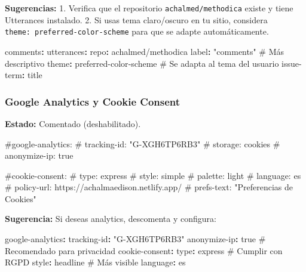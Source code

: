 \documentclass[
  doc,
  floatsintext,
  longtable,
  a4paper,
  nolmodern,
  notxfonts,
  notimes,
  12pt,
  colorlinks=true,linkcolor=blue,citecolor=blue,urlcolor=blue]{apa7}
\newenvironment{Shaded}{\begin{snugshade}}{\end{snugshade}}
\newcommand{\AttributeTok}[1]{\textcolor[rgb]{0.40,0.45,0.13}{#1}}
\newcommand{\CharTok}[1]{\textcolor[rgb]{0.13,0.47,0.30}{#1}}
\newcommand{\CommentTok}[1]{\textcolor[rgb]{0.37,0.37,0.37}{#1}}
\newcommand{\FunctionTok}[1]{\textcolor[rgb]{0.28,0.35,0.67}{#1}}
\newcommand{\KeywordTok}[1]{\textcolor[rgb]{0.00,0.23,0.31}{\textbf{#1}}}
\newcommand{\StringTok}[1]{\textcolor[rgb]{0.13,0.47,0.30}{#1}}
\begin{document}
\textbf{Sugerencias:} 1. Verifica que el repositorio
\texttt{achalmed/methodica} existe y tiene Utterances instalado. 2. Si
usas tema claro/oscuro en tu sitio, considera
\texttt{theme:\ preferred-color-scheme} para que se adapte
automáticamente.

\begin{Shaded}
\begin{Highlighting}[]
\FunctionTok{comments}\KeywordTok{:}
\AttributeTok{  }\FunctionTok{utterances}\KeywordTok{:}
\AttributeTok{    }\FunctionTok{repo}\KeywordTok{:}\AttributeTok{ achalmed/methodica}
\AttributeTok{    }\FunctionTok{label}\KeywordTok{:}\AttributeTok{ }\StringTok{"comments"}\CommentTok{                \# Más descriptivo}
\AttributeTok{    }\FunctionTok{theme}\KeywordTok{:}\AttributeTok{ preferred{-}color{-}scheme}\CommentTok{    \# Se adapta al tema del usuario}
\AttributeTok{    }\FunctionTok{issue{-}term}\KeywordTok{:}\AttributeTok{ title}
\end{Highlighting}
\end{Shaded}

\subsubsection{Google Analytics y Cookie
Consent}\label{google-analytics-y-cookie-consent}

\textbf{Estado:} Comentado (deshabilitado).

\begin{Shaded}
\begin{Highlighting}[]
\CommentTok{\#google{-}analytics:}
\CommentTok{ \# tracking{-}id: "G{-}XGH6TP6RB3"}
\CommentTok{ \# storage: cookies}
\CommentTok{ \# anonymize{-}ip: true}

\CommentTok{\#cookie{-}consent:}
\CommentTok{ \# type: express}
\CommentTok{ \# style: simple}
\CommentTok{ \# palette: light}
\CommentTok{ \# language: es}
\CommentTok{ \# policy{-}url: https://achalmaedison.netlify.app/}
\CommentTok{ \# prefs{-}text: "Preferencias de Cookies"}
\end{Highlighting}
\end{Shaded}

\textbf{Sugerencia:} Si deseas analytics, descomenta y configura:

\begin{Shaded}
\begin{Highlighting}[]
\FunctionTok{google{-}analytics}\KeywordTok{:}
\AttributeTok{  }\FunctionTok{tracking{-}id}\KeywordTok{:}\AttributeTok{ }\StringTok{"G{-}XGH6TP6RB3"}
\AttributeTok{  }\FunctionTok{anonymize{-}ip}\KeywordTok{:}\AttributeTok{ }\CharTok{true}\CommentTok{                 \# Recomendado para privacidad}
\AttributeTok{  }
\FunctionTok{cookie{-}consent}\KeywordTok{:}
\AttributeTok{  }\FunctionTok{type}\KeywordTok{:}\AttributeTok{ express}\CommentTok{                      \# Cumplir con RGPD}
\AttributeTok{  }\FunctionTok{style}\KeywordTok{:}\AttributeTok{ headline}\CommentTok{                    \# Más visible}
\AttributeTok{  }\FunctionTok{language}\KeywordTok{:}\AttributeTok{ es}
\end{Highlighting}
\end{Shaded}
\end{document}
